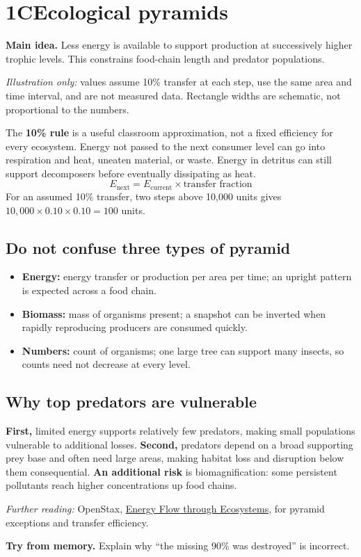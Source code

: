 \documentclass[11pt,letterpaper]{article}
\newcommand{\pagechapter}[2]{\clearpage\section*{#1}\phantomsection\label{#2}\addcontentsline{toc}{section}{#1}}
\newcommand{\idea}[1]{\textbf{Main idea.} #1\par}
\newcommand{\memorycheck}[1]{\par\smallskip\textbf{Try from memory.} #1\par}
\newcommand{\source}[1]{{\footnotesize\textit{Further reading:} #1\par}}
\begin{document}
\pagechapter{1C\quad Ecological pyramids}{pyramids}
\idea{Less energy is available to support production at successively higher trophic levels. This constrains food-chain length and predator populations.}
\begin{center}
\par
\end{center}
\textit{Illustration only:} values assume 10\% transfer at each step, use the same area and time interval, and are not measured data. Rectangle widths are schematic, not proportional to the numbers.

The \textbf{10\% rule} is a useful classroom approximation, not a fixed efficiency for every ecosystem. Energy not passed to the next consumer level can go into respiration and heat, uneaten material, or waste. Energy in detritus can still support decomposers before eventually dissipating as heat.
\[
E_{\text{next}}=E_{\text{current}}\times\text{transfer fraction}
\]
For an assumed 10\% transfer, two steps above 10,000 units gives
$10{,}000\times0.10\times0.10=100$ units.
\subsection*{Do not confuse three types of pyramid}
\begin{itemize}
\item \textbf{Energy:} energy transfer or production per area per time; an upright pattern is expected across a food chain.
\item \textbf{Biomass:} mass of organisms present; a snapshot can be inverted when rapidly reproducing producers are consumed quickly.
\item \textbf{Numbers:} count of organisms; one large tree can support many insects, so counts need not decrease at every level.
\end{itemize}
\subsection*{Why top predators are vulnerable}
\textbf{First,} limited energy supports relatively few predators, making small populations vulnerable to additional losses. \textbf{Second,} predators depend on a broad supporting prey base and often need large areas, making habitat loss and disruption below them consequential. \textbf{An additional risk} is biomagnification: some persistent pollutants reach higher concentrations up food chains.
\source{OpenStax, \href{https://openstax.org/books/biology-2e/pages/46-2-energy-flow-through-ecosystems}{Energy Flow through Ecosystems}, for pyramid exceptions and transfer efficiency.}
\memorycheck{Explain why ``the missing 90\% was destroyed'' is incorrect.}
\end{document}
